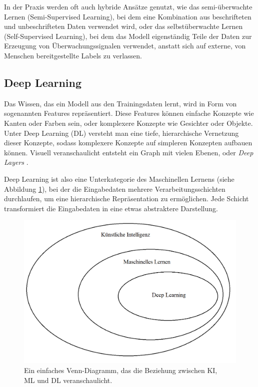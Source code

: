 In der Praxis werden oft auch hybride Ansätze genutzt, wie das semi-überwachte Lernen (Semi-Supervised Learning), bei dem eine Kombination aus beschrifteten und unbeschrifteten Daten verwendet wird, oder das selbstüberwachte Lernen (Self-Supervised Learning), bei dem das Modell eigenständig Teile der Daten zur Erzeugung von Überwachungssignalen verwendet, anstatt sich auf externe, von Menschen bereitgestellte Labels zu verlassen.

\subsection{Deep Learning} \label{sec:deep-learning}

Das Wissen, das ein Modell aus den Trainingsdaten lernt, wird in Form von sogenannten Features repräsentiert. Diese Features können einfache Konzepte wie Kanten oder Farben sein, oder komplexere Konzepte wie Gesichter oder Objekte. Unter Deep Learning (DL) versteht man eine tiefe, hierarchische Vernetzung dieser Konzepte, sodass komplexere Konzepte auf simpleren Konzepten aufbauen können. Visuell veranschaulicht entsteht ein Graph mit vielen Ebenen, oder \textit{Deep Layers} \parencite{Goodfellow2016deeplearning}.

Deep Learning ist also eine Unterkategorie des Maschinellen Lernens (siehe Abbildung \ref{fig:ai-venn}), bei der die Eingabedaten mehrere Verarbeitungsschichten durchlaufen, um eine hierarchische Repräsentation zu ermöglichen. Jede Schicht transformiert die Eingabedaten in eine etwas abstraktere Darstellung.

\begin{figure}[t]
	\centering
	\includegraphics[width=12cm]{figure_ai_venn-diagram.png}
	\caption{Ein einfaches Venn-Diagramm, das die Beziehung zwischen KI,\\
	ML und DL veranschaulicht.}
	\label{fig:ai-venn}
\end{figure}

